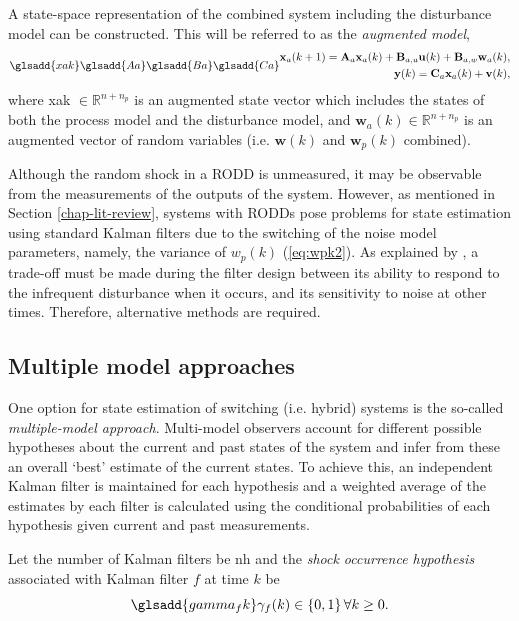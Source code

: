 A state-space representation of the combined system including the disturbance model can be constructed. This will be referred to as the \textit{augmented model},
\begin{equation} \label{eq:ss_rep_xa} \glsadd{xak} \glsadd{Aa} \glsadd{Ba} \glsadd{Ca}
	\begin{aligned}
		\mathbf{x}_a(k+1) = \mathbf{A}_a \mathbf{x}_a(k) + \mathbf{B}_{a,u} \mathbf{u}(k) + \mathbf{B}_{a,w} \mathbf{w}_{a}(k), \\
		\mathbf{y}(k) = \mathbf{C}_a \mathbf{x}_a(k) + \mathbf{v}(k),
	\end{aligned}
\end{equation}
where \gls{xak} $\in \mathbb{R}^{n+n_p}$ is an augmented state vector which includes the states of both the process model and the disturbance model, and $\mathbf{w}_a(k) \in \mathbb{R}^{n+n_p}$ is an augmented vector of random variables (i.e. $\mathbf{w}(k)$ and $\mathbf{w}_p(k)$ combined).

Although the random shock in a RODD is unmeasured, it may be observable from the measurements of the outputs of the system. However, as mentioned in Section \ref{chap-lit-review}, systems with RODDs pose problems for state estimation using standard Kalman filters due to the switching of the noise model parameters, namely, the variance of $w_p(k)$ (\ref{eq:wpk2}). As explained by \cite{robertson_detection_1995}, a trade-off must be made during the filter design between its ability to respond to the infrequent disturbance when it occurs, and its sensitivity to noise at other times. Therefore, alternative methods are required.


\subsection{Multiple model approaches}

One option for state estimation of switching (i.e. hybrid) systems is the so-called \textit{multiple-model approach}. Multi-model observers account for different possible hypotheses about the current and past states of the system and infer from these an overall `best' estimate of the current states. To achieve this, an independent Kalman filter is maintained for each hypothesis and a weighted average of the estimates by each filter is calculated using the conditional probabilities of each hypothesis given current and past measurements.

Let the number of Kalman filters be \gls{nh} and the \textit{shock occurrence hypothesis} associated with Kalman filter $f$ at time $k$ be
\begin{equation} \label{eq:gammak} \glsadd{gamma_fk}
	\gamma_{f}(k) \in \left\{0, 1 \right\} \forall{k \ge 0}.
\end{equation}

